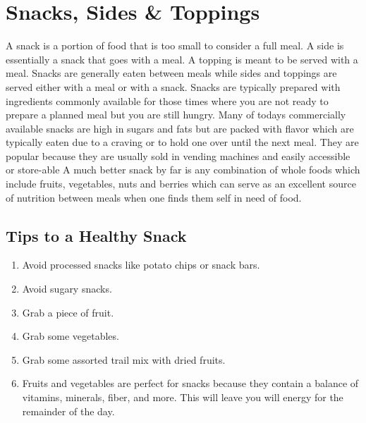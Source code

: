 \AddToShipoutPicture*{\FruitBowl}
\chapter{Snacks, Sides \& Toppings}

A snack is a portion of food that is too small to consider a full meal. A side is essentially a snack that goes with a meal. A topping is meant to be served with a meal. Snacks are generally eaten between meals while sides and toppings are served either with a meal or with a snack. Snacks are typically prepared with ingredients commonly available for those times where you are not ready to prepare a planned meal but you are still hungry. Many of todays commercially available snacks are high in sugars and fats but are packed with flavor which are typically eaten due to a craving or to hold one over until the next meal. They are popular because they are usually sold in vending machines and easily accessible or store-able A much better snack by far is any combination of whole foods which include fruits, vegetables, nuts and berries which can serve as an excellent source of nutrition between meals when one finds them self in need of food. 


\section*{Tips to a Healthy Snack}
\begin{enumerate}
	\item Avoid processed snacks like potato chips or snack bars.
	\item Avoid sugary snacks.
	\item Grab a piece of fruit.
	\item Grab some vegetables.
	\item Grab some assorted trail mix with dried fruits.
	\item Fruits and vegetables are perfect for snacks because they contain a balance of vitamins, minerals, fiber, and more. This will leave you will energy for the remainder of the day.
\end{enumerate}